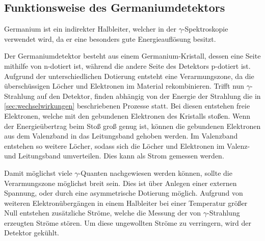\subsection{Funktionsweise des Germaniumdetektors}
\label{sec:funktionsweise}

Germanium ist ein indirekter Halbleiter,
welcher in der $\gamma$-Spektroskopie verwendet wird,
da er eine besonders gute Energieauflösung besitzt.

Der Germaniumdetektor besteht aus einem Germanium-Kristall,
dessen eine Seite mithilfe von n-dotiert ist,
während die andere Seite des Detektors p-dotiert ist.
Aufgrund der unterschiedlichen Dotierung entsteht eine Verarmungszone,
da die überschüssigen Löcher und Elektronen im Material rekombinieren.
Trifft nun $\gamma$-Strahlung auf den Detektor,
finden abhängig von der Energie der Strahlung die in \autoref{sec:wechselwirkungen} beschriebenen Prozesse statt.
Bei diesen entstehen freie Elektronen,
welche mit den gebundenen Elektronen des Kristalls stoßen.
Wenn der Energieübertrag beim Stoß groß genug ist,
können die gebundenen Elektronen aus dem Valenzband in das Leitungsband gehoben werden.
Im Valenzband entstehen so weitere Löcher,
sodass sich die Löcher und Elektronen im Valenz- und Leitungsband umverteilen.
Dies kann als Strom gemessen werden.

Damit möglichst viele $\gamma$-Quanten nachgewiesen werden können,
sollte die Verarmungszone möglichst breit sein.
Dies ist über Anlegen einer externen Spannung,
oder durch eine asymmetrische Dotierung möglich.
Aufgrund von weiteren Elektronübergängen in einem Halbleiter bei einer Temperatur größer Null entstehen zusätzliche Ströme,
welche die Messung der von $\gamma$-Strahlung erzeugten Ströme stören.
Um diese ungewollten Ströme zu verringern,
wird der Detektor gekühlt.
